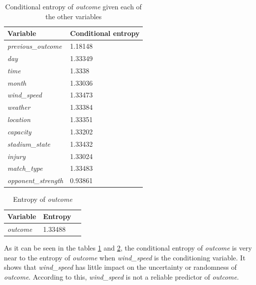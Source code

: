 \documentclass[titlepage]{article}
\begin{document}
\begin{table}[h!]
    \centering
    \small
    \setlength{\tabcolsep}{4pt}
    \begin{tabular}{|p{3cm}|p{4cm}|}
        \hline 
        \textbf{Variable} & \textbf{Conditional entropy}\\
        \hline
        \textit{previous\_outcome} & 1.18148\\
        \hline
        \textit{day} & 1.33349\\
        \hline
        \textit{time} & 1.3338\\
        \hline
        \textit{month} & 1.33036\\
        \hline
        \textit{wind\_speed} & 1.33473\\
        \hline
        \textit{weather} & 1.33384\\
        \hline
        \textit{location} & 1.33351\\
        \hline
        \textit{capacity} & 1.33202\\
        \hline
        \textit{stadium\_state} & 1.33432\\
        \hline
        \textit{injury} & 1.33024\\
        \hline
        \textit{match\_type} & 1.33483\\
        \hline
        \textit{opponent\_strength} & 0.93861\\
        \hline
    \end{tabular}
    \caption{Conditional entropy of \textit{outcome} given each of the other variables}
    \label{tab:q7_1}
\end{table}

\begin{table}[h!]
    \centering
    \small
    \setlength{\tabcolsep}{4pt}
    \begin{tabular}{|p{3cm}|p{2cm}|p{2cm}|}
        \hline 
        \textbf{Variable} & \textbf{Entropy}  \\
        \hline
        \textit{outcome} & 1.33488\\
        \hline
    \end{tabular}
    \caption{Entropy of \textit{outcome}}
    \label{tab:q7_2}
\end{table}

As it can be seen in the tables \ref{tab:q7_1} and \ref{tab:q7_2}, the conditional entropy of \textit{outcome} is very near to the entropy of \textit{outcome} when \textit{wind\_speed} is the conditioning variable. It shows that \textit{wind\_speed} has little impact on the uncertainty or randomness of \textit{outcome}. According to this, \textit{wind\_speed} is not a reliable predictor of \textit{outcome}.\\
\end{document}
